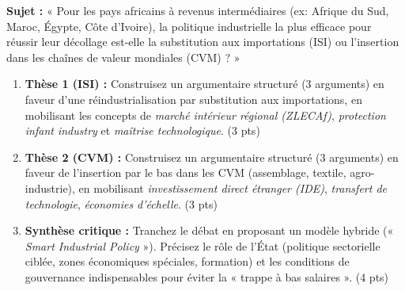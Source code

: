 \documentclass[11pt]{article}
\begin{document}
\begin{exercice}
\noindent \textbf{Sujet :} « Pour les pays africains à revenus intermédiaires (ex: Afrique du Sud, Maroc, Égypte, Côte d'Ivoire), la politique industrielle la plus efficace pour réussir leur décollage est-elle la substitution aux importations (ISI) ou l'insertion dans les chaînes de valeur mondiales (CVM) ? »

\begin{enumerate}
    \item \textbf{Thèse 1 (ISI) :} Construisez un argumentaire structuré (3 arguments) en faveur d'une réindustrialisation par substitution aux importations, en mobilisant les concepts de \textit{marché intérieur régional (ZLECAf)}, \textit{protection infant industry} et \textit{maîtrise technologique}. (3 pts)
    \item \textbf{Thèse 2 (CVM) :} Construisez un argumentaire structuré (3 arguments) en faveur de l'insertion par le bas dans les CVM (assemblage, textile, agro-industrie), en mobilisant \textit{investissement direct étranger (IDE)}, \textit{transfert de technologie}, \textit{économies d'échelle}. (3 pts)
    \item \textbf{Synthèse critique :} Tranchez le débat en proposant un modèle hybride (« \textit{Smart Industrial Policy} »). Précisez le rôle de l'État (politique sectorielle ciblée, zones économiques spéciales, formation) et les conditions de gouvernance indispensables pour éviter la « trappe à bas salaires ». (4 pts)
\end{enumerate}
\end{exercice}
\end{document}
